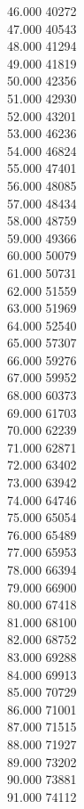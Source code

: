 { 46.000	40272 \\
 47.000	40543 \\
 48.000	41294 \\
 49.000	41819 \\
 50.000	42356 \\
 51.000	42930 \\
 52.000	43201 \\
 53.000	46236 \\
 54.000	46824 \\
 55.000	47401 \\
 56.000	48085 \\
 57.000	48434 \\
 58.000	48759 \\
 59.000	49366 \\
 60.000	50079 \\
 61.000	50731 \\
 62.000	51559 \\
 63.000	51969 \\
 64.000	52540 \\
 65.000	57307 \\
 66.000	59276 \\
 67.000	59952 \\
 68.000	60373 \\
 69.000	61703 \\
 70.000	62239 \\
 71.000	62871 \\
 72.000	63402 \\
 73.000	63942 \\
 74.000	64746 \\
 75.000	65054 \\
 76.000	65489 \\
 77.000	65953 \\
 78.000	66394 \\
 79.000	66900 \\
 80.000	67418 \\
 81.000	68100 \\
 82.000	68752 \\
 83.000	69288 \\
 84.000	69913 \\
 85.000	70729 \\
 86.000	71001 \\
 87.000	71515 \\
 88.000	71927 \\
 89.000	73202 \\
 90.000	73881 \\
 91.000	74112 \\
}
